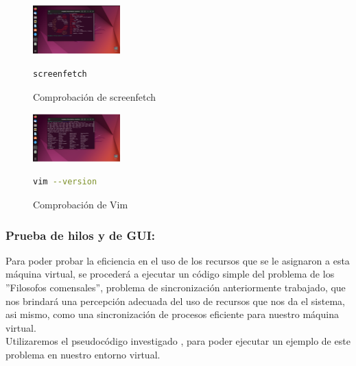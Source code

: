 \documentclass[journal]{IEEEtran}
\begin{document}
\begin{figure}[htbp]
  \centering
  \includegraphics[width=0.3\textwidth]{Hyper-V/6.png}
  \caption{Comprobación de screenfetch}
  \begin{lstlisting}[language=bash]
    screenfetch
  \end{lstlisting}
\end{figure}

\begin{figure}[h!]
  \centering
  \includegraphics[width=0.3\textwidth]{Hyper-V/7.png}
  \caption{Comprobación de Vim}

  \begin{lstlisting}[language=bash]
    vim --version
  \end{lstlisting}
\end{figure}

\FloatBarrier %

\subsubsection{Prueba de hilos y de GUI:}
Para poder probar la eficiencia en el uso de los recursos que se le asignaron a esta máquina virtual, se procederá a ejecutar un código simple del problema de los ''Filosofos comensales'', problema de sincronización anteriormente trabajado, que nos brindará una percepción adecuada del uso de recursos que nos da el sistema, asi mismo, como una sincronización de procesos eficiente para nuestro máquina virtual.\\

Utilizaremos el pseudocódigo investigado \cite{PhiloWiki}, para poder ejecutar un ejemplo de este problema en nuestro entorno virtual.
\end{document}

